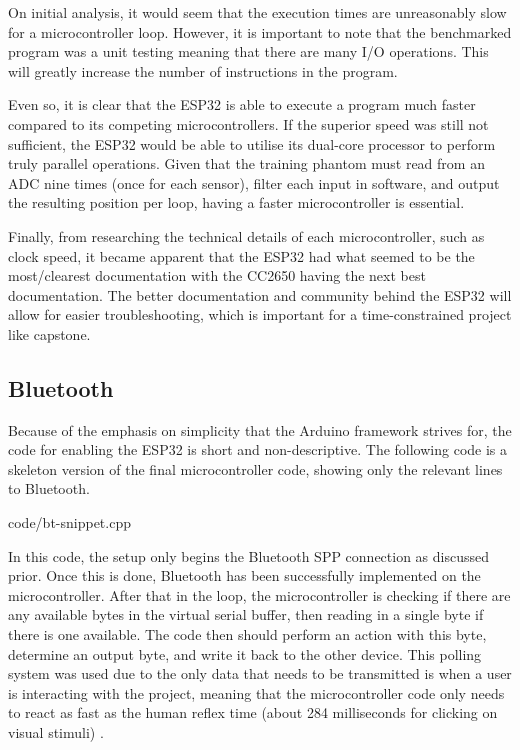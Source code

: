 \documentclass[12pt, titlepage]{article}
\begin{document}
On initial analysis, it would seem that the execution times are unreasonably slow for a microcontroller loop. However, it is important to note that the benchmarked program was a unit testing meaning that there are many I/O operations. This will greatly increase the number of instructions in the program.

Even so, it is clear that the ESP32 is able to execute a program much faster compared to its competing microcontrollers. If the superior speed was still not sufficient, the ESP32 would be able to utilise its dual-core processor to perform truly parallel operations. Given that the training phantom must read from an ADC nine times (once for each sensor), filter each input in software, and output the resulting position per loop, having a faster microcontroller is essential.

Finally, from researching the technical details of each microcontroller, such as clock speed, it became apparent that the ESP32 had what seemed to be the most/clearest documentation with the CC2650 having the next best documentation. The better documentation and community behind the ESP32 will allow for easier troubleshooting, which is important for a time-constrained project like capstone.

\subsection{Bluetooth}
Because of the emphasis on simplicity that the Arduino framework strives for, the code for enabling the ESP32 is short and non-descriptive. The following code is a skeleton version of the final microcontroller code, showing only the relevant lines to Bluetooth.

\enspace


{code/bt-snippet.cpp}

In this code, the setup only begins the Bluetooth SPP connection as discussed prior. Once this is done, Bluetooth has been successfully implemented on the microcontroller. After that in the loop, the microcontroller is checking if there are any available bytes in the virtual serial buffer, then reading in a single byte if there is one available. The code then should perform an action with this byte, determine an output byte, and write it back to the other device. This polling system was used due to the only data that needs to be transmitted is when a user is interacting with the project, meaning that the microcontroller code only needs to react as fast as the human reflex time (about 284 milliseconds for clicking on visual stimuli) \cite{reflex}.
\end{document}
